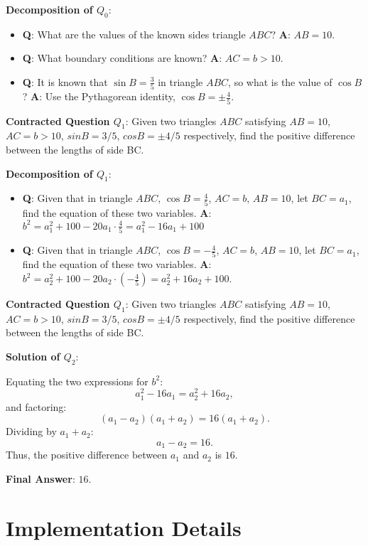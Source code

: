 \textbf{Decomposition of $Q_0$}:

\begin{itemize}
    \item \textbf{Q}: What are the values of the known sides triangle $ABC$? \textbf{A}: $AB = 10$.
    \item \textbf{Q}: What boundary conditions are known? \textbf{A}: $AC = b > 10$.
    \item \textbf{Q}: It is known that $\sin B = \frac{3}{5}$ in triangle $ABC$, so what is the value of $\cos B$? \textbf{A}: Use the Pythagorean identity, $\cos B = \pm \frac{4}{5}$. 
\end{itemize}

\textbf{Contracted Question $Q_1$}: Given two triangles $ABC$ satisfying $AB = 10$, $AC = b > 10$, $sin B = 3/5$, $cos B = \pm 4/5$ respectively, find the positive difference between the lengths of side BC.

\textbf{Decomposition of $Q_1$}:

\begin{itemize}
    \item \textbf{Q}: Given that in triangle $ABC$, $\cos B = \frac{4}{5}$, $AC=b$, $AB=10$, let $BC = a_1$, find the equation of these two variables. \textbf{A}: $b^2 = a_1^2 + 100 - 20a_1 \cdot \frac{4}{5} = a_1^2 - 16a_1 + 100$
    \item \textbf{Q}: Given that in triangle $ABC$, $\cos B = -\frac{4}{5}$, $AC=b$, $AB=10$, let $BC = a_1$, find the equation of these two variables. \textbf{A}: $b^2 = a_2^2 + 100 - 20a_2 \cdot \left(-\frac{4}{5}\right) = a_2^2 + 16a_2 + 100$.
\end{itemize}

\textbf{Contracted Question $Q_1$}: Given two triangles $ABC$ satisfying $AB = 10$, $AC = b > 10$, $sin B = 3/5$, $cos B = \pm 4/5$ respectively, find the positive difference between the lengths of side BC.


\textbf{Solution of $Q_2$}:

Equating the two expressions for $b^2$:
$$
a_1^2 - 16a_1 = a_2^2 + 16a_2,
$$
and factoring:
$$
(a_1 - a_2)(a_1 + a_2) = 16(a_1 + a_2).
$$
Dividing by $a_1 + a_2$:
$$
a_1 - a_2 = 16.
$$
Thus, the positive difference between $a_1$ and $a_2$ is $16$.

\textbf{Final Answer}: $\boxed{16}$.

\section{Implementation Details}
\label{appendix:implementation_details}

